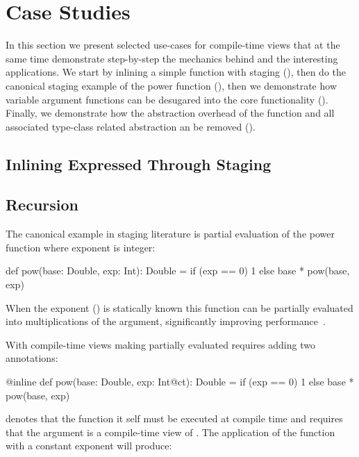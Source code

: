 \section{Case Studies}
\label{sct:case-studies}

In this section we present selected use-cases for compile-time views that at the
same  time demonstrate step-by-step the mechanics behind \tool and the
interesting applications.  We start by inlining a simple function with staging
(), then do the canonical staging  example of the power function
(), then we demonstrate how variable argument functions can
be  desugared into the core functionality (). Finally, we
demonstrate how the abstraction overhead of the  function and all
associated type-class related abstraction an be removed ().

\subsection{Inlining Expressed Through Staging}
\label{sct:inlining}




\subsection{Recursion}
\label{sct:recursion}

The canonical example in staging literature is partial evaluation of the power function
 where exponent is integer:
\begin{lstparagraph}
def pow(base: Double, exp: Int): Double =
  if (exp == 0) 1 else base * pow(base, exp)
\end{lstparagraph} When the exponent () is statically known this function can be partially
evaluated into  multiplications of the  argument, significantly
improving performance~\cite{}.

With compile-time views making partially evaluated requires adding two annotations:

\begin{lstparagraph}
@inline def pow(base: Double, exp: Int@ct): Double =
  if (exp == 0) 1 else base * pow(base, exp)
\end{lstparagraph}

 denotes that the  function it self must be executed at
 compile time and  requires that the  argument is a compile-time
 view of . The application of the function  with a constant
 exponent will produce:

